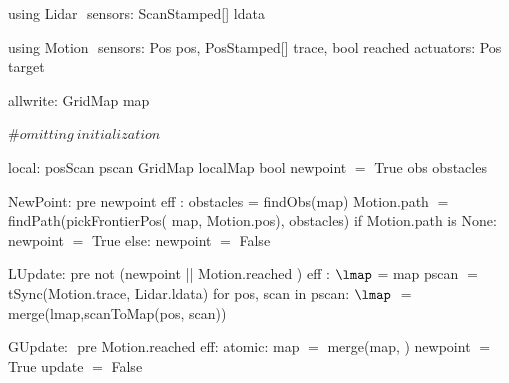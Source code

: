 using Lidar $\label{lidardef}$
    sensors:
       ScanStamped[] ldata

using Motion $\label{moddef}$
    sensors:
        Pos pos,
        PosStamped[] trace,
        bool reached
    actuators:
        Pos target

allwrite:$\label{awvar}$
    GridMap map

#$\mathit{omitting\ initialization}$

local:
   posScan pscan
   GridMap localMap
   bool newpoint $=$ True
   obs obstacles

NewPoint:$\label{newpt}$
  pre newpoint
  eff :
        obstacles = findObs(map)
        Motion.path $=$ findPath(pickFrontierPos(
                              map, Motion.pos), obstacles)
        if Motion.path is None:
           newpoint $=$ True
        else:
           newpoint $=$ False

LUpdate:$\label{lup}$
   pre not (newpoint || Motion.reached )
   eff :  $\lmap $ = map
          pscan $=$ tSync(Motion.trace, Lidar.ldata)
         for pos, scan in pscan:
             $\lmap$ $=$ merge(lmap,scanToMap(pos, scan))

GUpdate: $\label{gup}$
  pre Motion.reached
  eff: atomic:
           map $=$ merge(map, \lmap)
        newpoint $=$ True
        update $=$ False